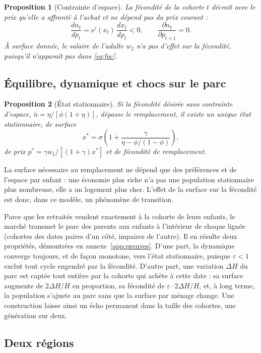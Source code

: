 \documentclass[11pt,a4paper]{article}
\theoremstyle{plain}
\newtheorem{proposition}{Proposition}
\theoremstyle{definition}
\theoremstyle{remark}
\newcommand{\eps}{\varepsilon}
\begin{document}
\begin{proposition}[Contrainte d'espace]\label{prop:coeur}
La fécondité de la cohorte $t$ décroît avec le prix qu'elle a affronté à l'achat et ne dépend pas du prix courant :
\[
\frac{dn_t}{dp_t} = \nu'(x_t)\,\frac{dx_t}{dp_t} < 0, \qquad \frac{\partial n_t}{\partial p_{t+1}} = 0.
\]
À surface donnée, le salaire de l'adulte $w_2$ n'a pas d'effet sur la fécondité, puisqu'il n'apparaît pas dans \eqref{eq:foc}.
\end{proposition}

\subsection{Équilibre, dynamique et chocs sur le parc}

\begin{proposition}[État stationnaire]\label{prop:ss}
Si la fécondité désirée sans contrainte d'espace, $\bar n = \eta/[\phi(1+\eta)]$, dépasse le remplacement, il existe un unique état stationnaire, de surface
\[
x^* = \sigma\left(1 + \frac{\gamma}{\eta - \phi/(1-\phi)}\right),
\]
de prix $p^* = \gamma w_1/[(1+\gamma)x^*]$ et de fécondité de remplacement.
\end{proposition}

La surface nécessaire au remplacement ne dépend que des préférences et de l'espace par enfant : une économie plus riche n'a pas une population stationnaire plus nombreuse, elle a un logement plus cher. L'effet de la surface sur la fécondité est donc, dans ce modèle, un phénomène de transition.

Parce que les retraités vendent exactement à la cohorte de leurs enfants, le marché transmet le parc des parents aux enfants à l'intérieur de chaque lignée (cohortes des dates paires d'un côté, impaires de l'autre). Il en résulte deux propriétés, démontrées en annexe~\ref{app:preuves}. D'une part, la dynamique converge toujours, et de façon monotone, vers l'état stationnaire, puisque $\eps < 1$ exclut tout cycle engendré par la fécondité. D'autre part, une variation $\Delta H$ du parc est captée tout entière par la cohorte qui achète à cette date : sa surface augmente de $2\Delta H/H$ en proportion, sa fécondité de $\eps\cdot 2\Delta H/H$, et, à long terme, la population s'ajuste au parc sans que la surface par ménage change. Une construction laisse ainsi un écho permanent dans la taille des cohortes, une génération sur deux.

\subsection{Deux régions}
\end{document}
